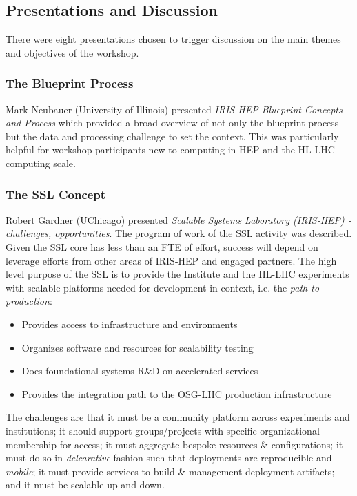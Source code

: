 \documentclass[11pt,letterpaper,fleqn]{article}
\begin{document}
\subsection{Presentations and Discussion}

There were eight presentations chosen to trigger discussion on the main themes and objectives of the workshop.


\subsubsection{The Blueprint Process}
Mark Neubauer (University of Illinois) presented {\it IRIS-HEP Blueprint Concepts and Process} which provided a broad overview of not only the blueprint process but the data and processing challenge to set the context. This was particularly helpful for workshop participants new to computing in HEP and the HL-LHC computing scale. 

\subsubsection{The SSL Concept}
Robert Gardner (UChicago) presented {\it Scalable Systems Laboratory (IRIS-HEP) - challenges, opportunities}.  The program of work of the SSL activity was described.  Given the SSL core has less than an FTE of effort, success will depend on leverage efforts from other areas of IRIS-HEP and engaged partners. The high level purpose of the SSL is to provide the Institute and the HL-LHC experiments with scalable platforms needed for development in context, i.e. the {\it path to production}: 

\begin{itemize}
  \item Provides access to infrastructure and environments
  \item Organizes software and resources for scalability testing
  \item Does foundational systems R\&D on accelerated services
  \item Provides the integration path to the OSG-LHC production infrastructure
\end{itemize}

The challenges are that it must be a community platform across experiments and institutions; it should support groups/projects with specific organizational membership for access; it must aggregate bespoke resources \& configurations; it must do so in {\it delcarative} fashion such that deployments are reproducible and {\it mobile}; it must provide services to build \& management deployment artifacts; and it must be scalable up and down.  
\end{document}
